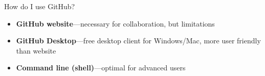 \documentclass[12pt, compress]{beamer} %
\let\noteitem\item %
\renewcommand{\item}{ 
	\noteitem\vspace{\fill}
	}
\begin{document}
%	
%	
		
	\begin{frame}{How do I use GitHub?}
	
		\begin{itemize}
			\item \textbf{GitHub website}---necessary for collaboration, but limitations
			\item \textbf{GitHub Desktop}---free desktop client for Windows/Mac, more user friendly than website
			\item \textbf{Command line (shell)}---optimal for advanced users
		\end{itemize}
	\end{frame}

%	
%	
\end{document}
